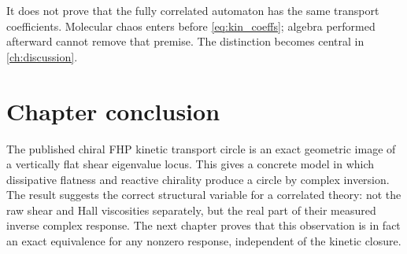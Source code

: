 It does not prove that the fully correlated automaton has the same transport coefficients. Molecular chaos enters before \cref{eq:kin_coeffs}; algebra performed afterward cannot remove that premise. The distinction becomes central in \cref{ch:discussion}.

\section{Chapter conclusion}
The published chiral FHP kinetic transport circle is an exact geometric image of a vertically flat shear eigenvalue locus. This gives a concrete model in which dissipative flatness and reactive chirality produce a circle by complex inversion. The result suggests the correct structural variable for a correlated theory: not the raw shear and Hall viscosities separately, but the real part of their measured inverse complex response. The next chapter proves that this observation is in fact an exact equivalence for any nonzero response, independent of the kinetic closure.
